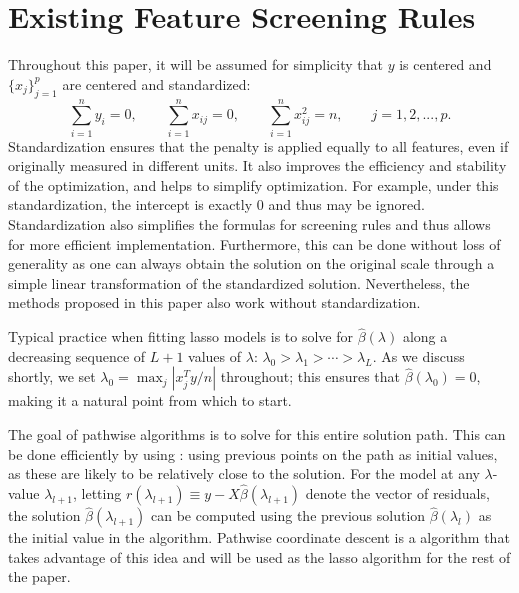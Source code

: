 \section{Existing Feature Screening Rules}
\label{sec:existing}

Throughout this paper, it will be assumed for simplicity that $y$ is centered and $\{x_j\}_{j=1}^p$ are centered and standardized:
\begin{equation}
  \label{eq:std}
  \sum_{i=1}^ny_i=0, \qquad \sum_{i=1}^n x_{ij}=0, \qquad \sum_{i=1}^n x_{ij}^2=n,\qquad j=1,2,...,p.
\end{equation}
Standardization ensures that the penalty is applied equally to all features, even if originally measured in different units. It also improves the efficiency and stability of the optimization, and helps to simplify optimization. For example, under this standardization, the intercept is exactly 0 and thus may be ignored. Standardization also simplifies the formulas for screening rules and thus allows for more efficient implementation. Furthermore, this can be done without loss of generality as one can always obtain the solution on the original scale through a simple linear transformation of the standardized solution. Nevertheless, the methods proposed in this paper also work without standardization.

Typical practice when fitting lasso models is to solve for $\hat{\beta}(\lambda)$ along a decreasing sequence of $L+1$ values of $\lambda$: $\lambda_0 > \lambda_1 > \cdots > \lambda_L$.  As we discuss shortly, we set $\lambda_0=\max_j|x_j^Ty/n|$ throughout; this ensures that $\hat{\beta}(\lambda_0)=0$, making it a natural point from which to start.

The goal of pathwise algorithms is to solve for this entire solution path.  This can be done efficiently by using : using previous points on the path as initial values, as these are likely to be relatively close to the solution.  For the model at any $\lambda$-value $\lambda_{l+1}$, letting $r(\lambda_{l+1}) \equiv y-X\hat{\beta}(\lambda_{l+1})$ denote the vector of residuals, the solution $\hat{\beta}(\lambda_{l+1})$ can be computed using the previous solution $\hat{\beta}(\lambda_l)$ as the initial value in the algorithm. Pathwise coordinate descent is a algorithm that takes advantage of this idea and will be used as the lasso algorithm for the rest of the paper.


